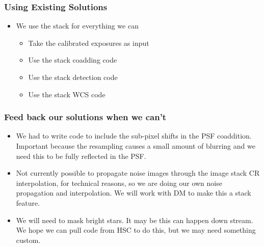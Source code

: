 \documentclass{beamer}
\begin{document}
\frame
{

    \frametitle{Using Existing Solutions}

    \begin{itemize}

                \item We use the stack for everything we can
                    \begin{itemize}

                        \item Take the calibrated exposures as input

                        \item Use the stack coadding code

                        \item Use the stack detection code

                        \item Use the stack WCS code

                    \end{itemize}

    \end{itemize}

}
\frame
{

    \frametitle{Feed back our solutions when we can't}


    \begin{itemize}


                \item We had to write code to include the sub-pixel shifts in
                    the PSF coaddition.  Important because the resampling
                    causes a small amount of blurring and we need this to be
                    fully reflected in the PSF.

                \item Not currently possible to propagate noise images through the image
                  stack CR interpolation, for technical reasons, so we are doing our own noise
                  propagation and interpolation.  We will work with DM to make
                  this a stack feature.

                \item We will need to mask bright stars. It may be this can
                    happen down stream. We hope we can pull code from HSC to do
                    this, but we may need something custom.



    \end{itemize}

}
\end{document}

